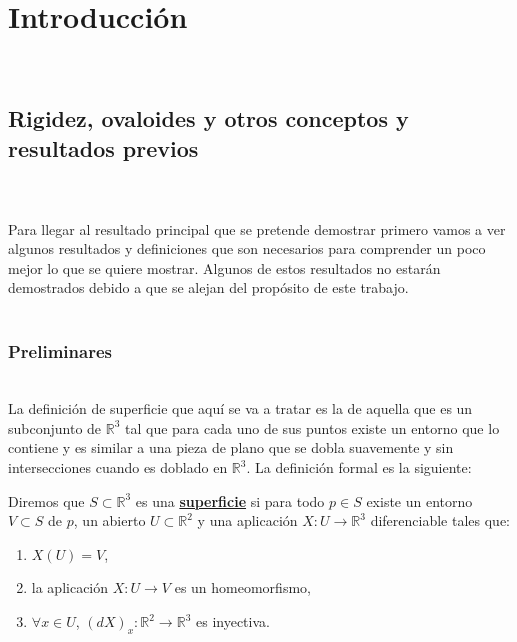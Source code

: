 \chapter{Introducción}

${ }$\\
\section{Rigidez, ovaloides y otros conceptos y resultados previos}
${ }$\\
${ }$\\


Para llegar al resultado principal que se pretende demostrar primero vamos a ver algunos resultados y definiciones que son necesarios para comprender un poco mejor lo que se quiere mostrar. Algunos de estos resultados no estarán demostrados debido a que se alejan del propósito de este trabajo.
${ }$\\



${ }$\\
\subsection{Preliminares}
${ }$\\


La definición de superficie que aquí se va a tratar es la de aquella que es un subconjunto de $\mathbb{R}^3$ tal que para cada uno de sus puntos existe un entorno que lo contiene y es similar a una pieza de plano que se dobla suavemente y sin intersecciones cuando es doblado en $\mathbb{R}^3$. La definición formal es la siguiente:
${ }$\\

\begin{definicion}
	Diremos que $S \subset \mathbb{R}^3$ es una \underline{\textbf{superficie}} si para todo $p \in S$ existe un entorno $V \subset S$ de $p$, un abierto $U \subset \mathbb{R}^2$ y una aplicación $X : U \to \mathbb{R}^3$ diferenciable tales que:
	\begin{enumerate}
		\item $X(U) = V$,
		\item la aplicación $X : U \to V$ es un homeomorfismo,
		\item $\forall x \in U$, $(dX)_x : \mathbb{R}^2 \to \mathbb{R}^3$ es inyectiva.
	\end{enumerate}
\end{definicion}
${ }$\\

